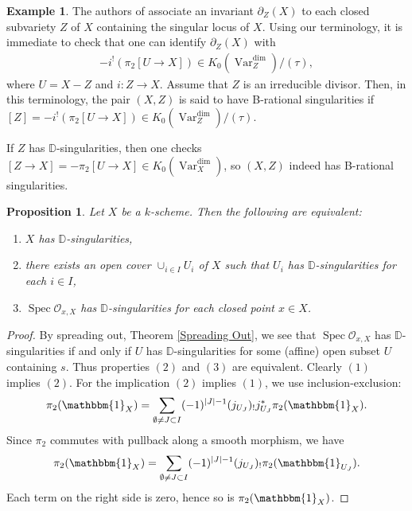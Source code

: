\documentclass{amsart}
\newtheorem{prop}[thm]{Proposition}
\theoremstyle{definition}
\newtheorem{exmp}[thm]{Example}
\DeclareMathOperator{\Var}{Var}
\newcommand{\KdimX}{K_0(\Var_X^{\dim})}
\numberwithin{equation}{section}
\begin{document}
\begin{exmp}\label{B exmp}
The authors of \cite{kontsevichtschinkel} associate an invariant $\partial_Z(X)$ to each closed subvariety $Z$ of $X$ containing the singular locus of $X$. Using our terminology, it is immediate to check that one can identify $\partial_Z(X)$ with
\begin{align*}
    -i^!(\pi_2 [U \rightarrow X]) \in K_0(\Var_Z^{\dim})/(\tau),
\end{align*}
where $U = X-Z$ and $i:Z \rightarrow X$. Assume that $Z$ is an irreducible divisor. Then, in this terminology, the pair $(X,Z)$ is said to have B-rational singularities if $[Z] = -i^!(\pi_2 [U \rightarrow X]) \in K_0(\Var_Z^{\dim})/(\tau)$.

If $Z$ has $\mathbb{D}$-singularities, then one checks $[Z \rightarrow X] = -\pi_2[U \rightarrow X] \in \KdimX$, so $(X, Z)$ indeed has B-rational singularities.
\end{exmp}


\begin{prop}\label{local}
Let $X$ be a $k$-scheme. Then the following are equivalent:
\begin{enumerate}
    \item $X$ has $\mathbb{D}$-singularities,
    \item there exists an open cover $\cup_{i \in I} U_i$ of $X$ such that $U_i$ has $\mathbb{D}$-singularities for each $i \in I$,
    \item $\mathop{\mathrm{Spec}}\mathscr{O}_{x,X}$ has $\mathbb{D}$-singularities for each closed point $x \in X$.
\end{enumerate}
\end{prop}

\begin{proof}
By spreading out, Theorem \ref{Spreading Out}, we see that $\mathop{\mathrm{Spec}}\mathscr{O}_{x,X}$ has $\mathbb{D}$-singularities if and only if $U$ has $\mathbb{D}$-singularities for some (affine) open subset $U$ containing $s$. Thus properties $(2)$ and $(3)$ are equivalent. Clearly $(1)$ implies $(2)$. For the implication $(2)$ implies $(1)$, we use inclusion-exclusion:
\begin{align*}
    \pi_2(\mathbbm{1}_X)= \sum_{\emptyset \neq J \subset I} (-1)^{|J|-1} (j_{U_J})_! j_{U_J}^* \pi_2(\mathbbm{1}_{X}).
\end{align*}
Since $\pi_2$ commutes with pullback along a smooth morphism, we have
\begin{align*}
    \pi_2(\mathbbm{1}_X)= \sum_{\emptyset \neq J \subset I} (-1)^{|J|-1} (j_{U_J})_! \pi_2(\mathbbm{1}_{U_J}).
\end{align*}
Each term on the right side is zero, hence so is $\pi_2(\mathbbm{1}_X)$.
\end{proof}
\end{document}
